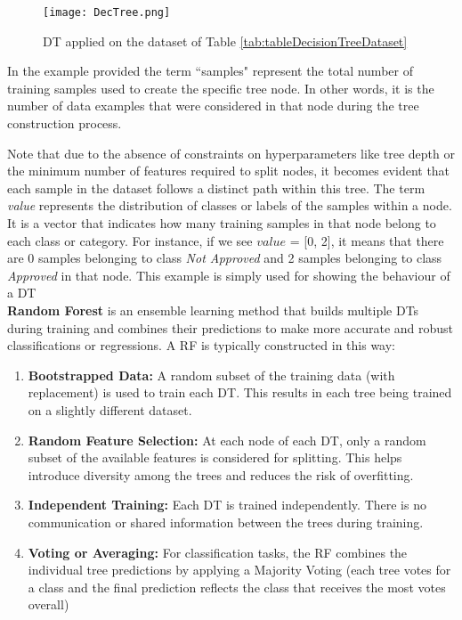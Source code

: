 \begin{figure}[H]
  \centering
  \texttt{[image: DecTree.png]}
  \label{fig:knn5}
  \caption{DT applied on the dataset of Table \ref{tab:tableDecisionTreeDataset}}
\end{figure}
In the example provided the term “samples" represent the total number of training samples used to create the specific tree node. 
In other words, it is the number of data examples that were considered in that node during the tree construction process.

Note that due to the absence of constraints on hyperparameters like tree depth or the minimum number of features required to split nodes, 
it becomes evident that each sample in the dataset follows a distinct path within this tree. 
The term \textit{value} represents the distribution of classes or labels of the samples within a node. 
It is a vector that indicates how many training samples in that node belong to each class or category. 
For instance, if we see $value$ = [0, 2], it means that there are 0 samples belonging to class \textit{Not Approved} and 2 samples belonging to class \textit{Approved} in that node.
This example is simply used for showing the behaviour of a DT\\
\clearpage
\textbf{Random Forest} is an ensemble learning method that builds multiple DTs during training and combines their predictions to make more accurate and robust classifications or regressions.
A RF is typically constructed in this way:
\begin{enumerate}
  \item \textbf{Bootstrapped Data:} A random subset of the training data (with replacement) is used to train each DT. This results in each tree being trained on a slightly different dataset.
  \item \textbf{Random Feature Selection:} At each node of each DT, only a random subset of the available features is considered for splitting. This helps introduce diversity among the trees and reduces the risk of overfitting.
  \item \textbf{Independent Training:} Each DT is trained independently. There is no communication or shared information between the trees during training.
  \item \textbf{Voting or Averaging:} For classification tasks, the RF combines the individual tree predictions by applying a Majority Voting (each tree votes for a class and the final prediction reflects the class that receives the most votes overall)
\end{enumerate}
